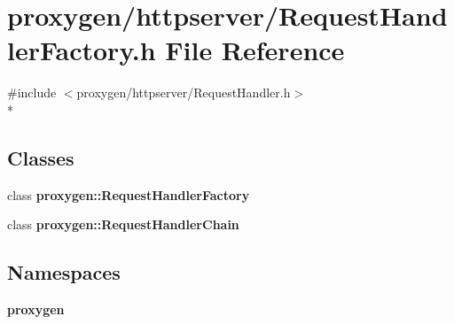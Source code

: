 \section{proxygen/httpserver/\+Request\+Handler\+Factory.h File Reference}
\label{RequestHandlerFactory_8h}
{\ttfamily \#include $<$proxygen/httpserver/\+Request\+Handler.\+h$>$}\\*
\subsection*{Classes}
\begin{DoxyCompactItemize}
\item 
class {\bf proxygen\+::\+Request\+Handler\+Factory}
\item 
class {\bf proxygen\+::\+Request\+Handler\+Chain}
\end{DoxyCompactItemize}
\subsection*{Namespaces}
\begin{DoxyCompactItemize}
\item 
 {\bf proxygen}
\end{DoxyCompactItemize}
